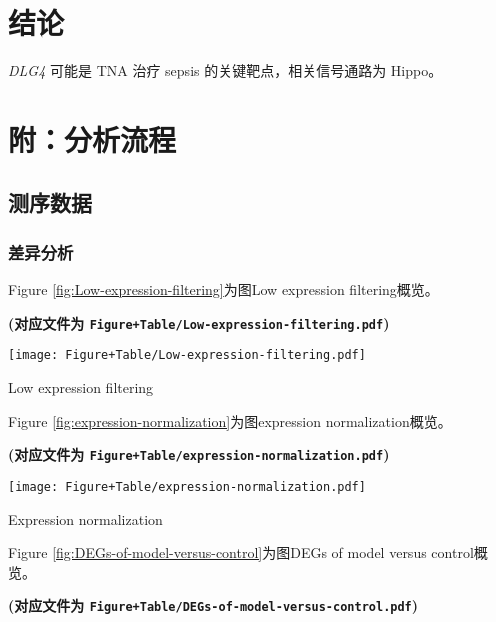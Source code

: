 \documentclass[
]{article}
\begin{document}
\hypertarget{dis}{%
\section{结论}\label{dis}}

\emph{DLG4} 可能是 TNA 治疗 sepsis 的关键靶点，相关信号通路为 Hippo。

\hypertarget{ux9644ux5206ux6790ux6d41ux7a0b}{%
\section{附：分析流程}\label{ux9644ux5206ux6790ux6d41ux7a0b}}

\hypertarget{ux6d4bux5e8fux6570ux636e}{%
\subsection{测序数据}\label{ux6d4bux5e8fux6570ux636e}}

\hypertarget{ux5deeux5f02ux5206ux6790}{%
\subsubsection{差异分析}\label{ux5deeux5f02ux5206ux6790}}

Figure \ref{fig:Low-expression-filtering}为图Low expression filtering概览。

\textbf{(对应文件为 \texttt{Figure+Table/Low-expression-filtering.pdf})}

\def\@captype{figure}
\begin{center}
\texttt{[image: Figure+Table/Low-expression-filtering.pdf]}
\caption{Low expression filtering}\label{fig:Low-expression-filtering}
\end{center}

Figure \ref{fig:expression-normalization}为图expression normalization概览。

\textbf{(对应文件为 \texttt{Figure+Table/expression-normalization.pdf})}

\def\@captype{figure}
\begin{center}
\texttt{[image: Figure+Table/expression-normalization.pdf]}
\caption{Expression normalization}\label{fig:expression-normalization}
\end{center}

Figure \ref{fig:DEGs-of-model-versus-control}为图DEGs of model versus control概览。

\textbf{(对应文件为 \texttt{Figure+Table/DEGs-of-model-versus-control.pdf})}
\end{document}
